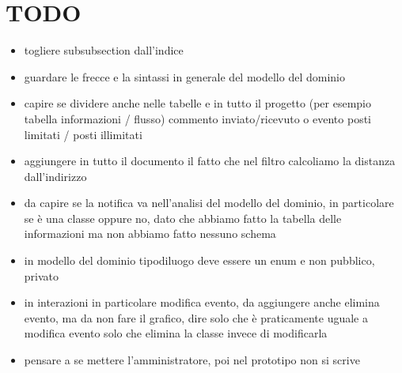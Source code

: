\documentclass[12pt,a4paper]{report}
\begin{document}
\section{TODO}
\begin{itemize}[leftmargin=*]
    \item togliere subsubsection dall'indice
    \item guardare le frecce e la sintassi in generale del modello del dominio
    \item capire se dividere anche nelle tabelle e in tutto il progetto (per esempio tabella informazioni / flusso) commento inviato/ricevuto o evento posti limitati / posti illimitati
    \item aggiungere in tutto il documento il fatto che nel filtro calcoliamo la distanza dall'indirizzo
    \item da capire se la notifica va nell'analisi del modello del dominio, in particolare se è una classe oppure no, dato che abbiamo fatto la tabella delle informazioni ma non abbiamo fatto nessuno schema
    \item in modello del dominio tipodiluogo deve essere un enum e non {pubblico, privato}
    \item in interazioni in particolare modifica evento, da aggiungere anche elimina evento, ma da non fare il grafico, dire solo che è praticamente uguale a modifica evento solo che elimina la classe invece di modificarla
    \item pensare a se mettere l'amministratore, poi nel prototipo non si scrive
\end{itemize}
\end{document}
